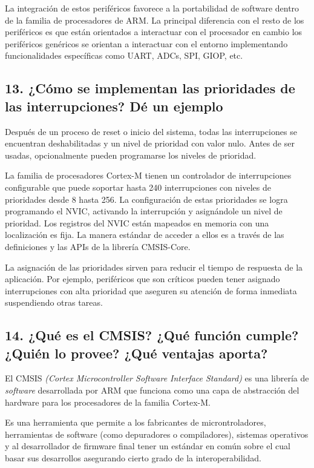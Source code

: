 \documentclass[10pt,a4paper,twoside,spanish]{article}	%
\begin{document}
La integración de estos periféricos favorece a la portabilidad de software dentro de la familia de procesadores de ARM. La principal diferencia con el resto de los periféricos es que están orientados a interactuar con el procesador en cambio los periféricos genéricos se orientan a interactuar con el entorno implementando funcionalidades específicas como UART, ADCs, SPI, GIOP, etc.



\subsection*{13. ¿Cómo se implementan las prioridades de las interrupciones? Dé un ejemplo}

Después de un proceso de reset o inicio del sistema, todas las interrupciones se encuentran deshabilitadas y un nivel de prioridad con valor nulo. Antes de ser usadas, opcionalmente pueden programarse los niveles de prioridad.

La familia de procesadores Cortex-M tienen un controlador de interrupciones configurable que puede soportar hasta 240 interrupciones con niveles de prioridades desde 8 hasta 256. 
La configuración de estas prioridades se logra programando el NVIC, activando la interrupción y asignándole un nivel de prioridad. Los registros del NVIC están mapeados en memoria con una localización es fija. La manera estándar de acceder a ellos es a través de las definiciones y las APIs de la librería CMSIS-Core.

La asignación de las prioridades sirven para reducir el tiempo de respuesta de la aplicación. Por ejemplo, periféricos que son críticos pueden tener asignado interrupciones con alta prioridad que aseguren su atención de forma inmediata suspendiendo otras tareas.

\subsection*{14. ¿Qué es el CMSIS? ¿Qué función cumple? ¿Quién lo provee? ¿Qué ventajas aporta?}

El CMSIS \textit{(Cortex Microcontroller Software Interface Standard)} es una librería de \textit{software} desarrollada por ARM que funciona como  una capa de abstracción del hardware para los procesadores de la familia Cortex-M.

Es una herramienta que permite a los fabricantes de microntroladores, herramientas de software (como depuradores o compiladores), sistemas operativos y al desarrollador de firmware final tener un estándar en común sobre el cual basar sus desarrollos asegurando cierto grado de la interoperabilidad.
\end{document}
